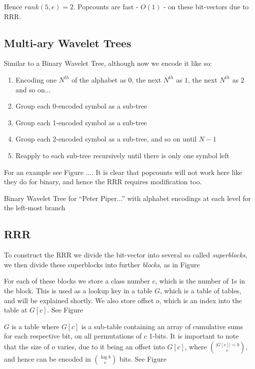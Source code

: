 Hence $rank(5, e) = 2$. Popcounts are fast - $O(1)$ - on these bit-vectors due
to RRR.


\subsection{Multi-ary Wavelet Trees}
Similar to a Binary Wavelet Tree, although now we encode it like so:

\begin{enumerate}
    \item Encoding one $N^{th}$ of the alphabet as $0$, the next $N^{th}$ as $1$,
    the next $N^{th}$ as $2$ and so on...
    \item Group each 0-encoded symbol as a sub-tree
    \item Group each 1-encoded symbol as a sub-tree
    \item Group each 2-encoded symbol as a sub-tree, and so on until $N-1$
    \item Reapply to each sub-tree recursively until there is only one symbol
    left
\end{enumerate}
For an example see Figure .... It is clear that popcounts will not work
here like they do for binary, and hence the RRR requires modification too.

			{Binary Wavelet Tree for ``Peter Piper...'' with alphabet
			encodings at each level for the left-most branch}




\subsection{RRR}
To construct the RRR we divide the bit-vector into several so called \emph{superblocks}, we then divide these superblocks into further \emph{blocks}, as in Figure%

For each of these blocks we store a class number $c$, which is the number of $1$s in the block. This is used as a lookup key in a table $G$, which is a table of tables, and will be explained shortly. We also store offset $o$, which is an index into the table at $G[c]$. See Figure%

$G$ is a table where $G[c]$ is a sub-table containing an array of cumulative sums for each respective bit, on all permutations of $c$ 1-bits. It is important to note that the size of $o$ varies, due to it being an offset into $G[c]$, where $|G[c]| = b \choose c$, and hence can be encoded in $\log b \choose c$ bits. See Figure %


